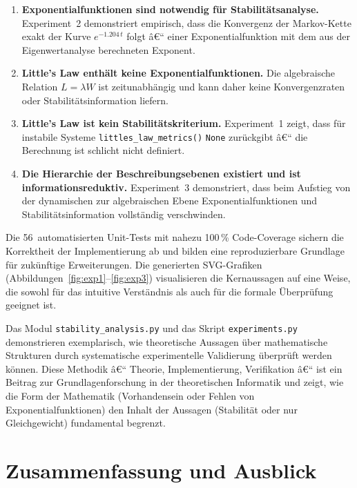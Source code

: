 ﻿\documentclass[a4paper,12pt]{scrreprt}
\theoremstyle{definition}
\begin{document}
\begin{enumerate}
	\item \textbf{Exponentialfunktionen sind notwendig für
		Stabilitätsanalyse.}  Experiment~2 demonstriert empirisch,
	dass die Konvergenz der Markov-Kette exakt der Kurve
	$e^{-1.204\,t}$ folgt â€“ einer Exponentialfunktion mit dem
	aus der Eigenwertanalyse berechneten Exponent.
	
	\item \textbf{Little's Law enthält keine Exponentialfunktionen.}
	Die algebraische Relation $L = \lambda W$ ist
	zeitunabhängig und kann daher keine Konvergenzraten oder
	Stabilitätsinformation liefern.
	
	\item \textbf{Little's Law ist kein Stabilitätskriterium.}
	Experiment~1 zeigt, dass für instabile Systeme \texttt{littles\_law\_metrics()}
	\texttt{None} zurückgibt â€“ die
	Berechnung ist schlicht nicht definiert.
	
	\item \textbf{Die Hierarchie der Beschreibungsebenen existiert
		und ist informationsreduktiv.}  Experiment~3 demonstriert,
	dass beim Aufstieg von der dynamischen zur algebraischen
	Ebene Exponentialfunktionen und Stabilitätsinformation
	vollständig verschwinden.
\end{enumerate}

Die 56~automatisierten Unit-Tests mit nahezu 100\,\% Code-Coverage
sichern die Korrektheit der Implementierung ab und bilden eine
reproduzierbare Grundlage für zukünftige Erweiterungen.  Die
generierten SVG-Grafiken (Abbildungen~\ref{fig:exp1}--\ref{fig:exp3})
visualisieren die Kernaussagen auf eine Weise, die sowohl für
das intuitive Verständnis als auch für die formale Überprüfung
geeignet ist.

Das Modul \texttt{stability\_analysis.py} und das Skript
\texttt{experiments.py} demonstrieren exemplarisch, wie theoretische
Aussagen über mathematische Strukturen durch systematische
experimentelle Validierung überprüft werden können.  Diese Methodik
â€“ Theorie, Implementierung, Verifikation â€“ ist ein Beitrag zur
Grundlagenforschung in der theoretischen Informatik und zeigt, wie
die Form der Mathematik (Vorhandensein oder Fehlen von
Exponentialfunktionen) den Inhalt der Aussagen (Stabilität oder nur
Gleichgewicht) fundamental begrenzt.

\section{Zusammenfassung und Ausblick}
\end{document}

